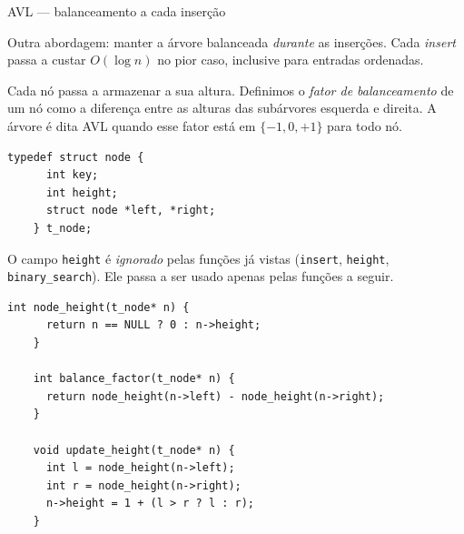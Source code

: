 \documentclass{beamer}
\begin{document}
\begin{frame}{AVL --- balanceamento a cada inserção}

  Outra abordagem: manter a árvore balanceada \emph{durante} as
  inserções. Cada \emph{insert} passa a custar $O(\log n)$ no pior
  caso, inclusive para entradas ordenadas.

  Cada nó passa a armazenar a sua altura. Definimos o \emph{fator de
    balanceamento} de um nó como a diferença entre as alturas das
  subárvores esquerda e direita. A árvore é dita AVL quando esse fator
  está em $\{-1, 0, +1\}$ para todo nó.

  \framebreak

  \begin{lstlisting}[style=normalc,caption=tree.c]
    typedef struct node {
      int key;
      int height;
      struct node *left, *right;
    } t_node;
  \end{lstlisting}

  O campo \texttt{height} é \emph{ignorado} pelas funções já vistas
  (\texttt{insert}, \texttt{height}, \texttt{binary\_search}). Ele
  passa a ser usado apenas pelas funções a seguir.

  \framebreak

  \begin{lstlisting}[style=normalc,caption=tree.c]
    int node_height(t_node* n) {
      return n == NULL ? 0 : n->height;
    }

    int balance_factor(t_node* n) {
      return node_height(n->left) - node_height(n->right);
    }

    void update_height(t_node* n) {
      int l = node_height(n->left);
      int r = node_height(n->right);
      n->height = 1 + (l > r ? l : r);
    }
  \end{lstlisting}

\end{frame}
\end{document}
